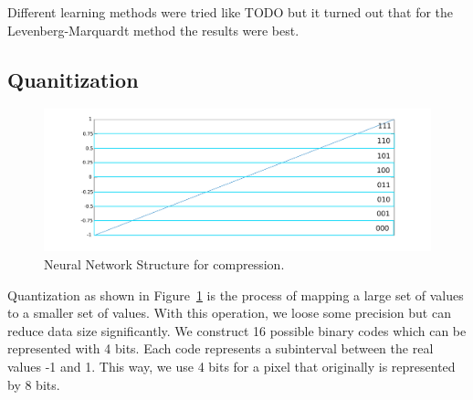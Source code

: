Different learning methods were tried like {\color{red}TODO} but it turned out that for the Levenberg-Marquardt method the results were best. 



\subsection{Quanitization}
\label{sec:quanitization}
\begin{figure}[tbp]
  \centering
  \includegraphics[width=\columnwidth]{images/bqQuantizer}
  \caption{Neural Network Structure for compression.}
  \label{fig:bpQuantizer}
\end{figure}

Quantization as shown in Figure~\ref{fig:bpQuantizer} is the process of mapping a large set of values to a smaller set of values. With this operation, we loose some precision but can reduce data size significantly. We construct 16 possible binary codes which can be represented with 4 bits. Each code represents a subinterval between the real values -1 and 1. This way, we use 4 bits for a pixel that originally is represented by 8 bits.  

